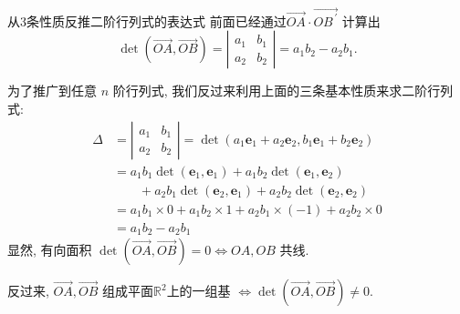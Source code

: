 \documentclass[10pt,punct]{ctexbeamer}
\begin{document}
\begin{frame}{从3条性质反推二阶行列式的表达式}
    前面已经通过$\overrightarrow{O A} \cdot \overrightarrow{O B^{\, \prime}}$ 计算出
    $$\operatorname{det}(\overrightarrow{O A}, \overrightarrow{O B})=\left|\begin{array}{ll}a_1 & b_1 \\ a_2 & b_2\end{array}\right|=a_1 b_2-a_2 b_1.$$


    为了推广到任意 $n$ 阶行列式, 我们反过来利用上面的三条基本性质来求二阶行列式:
    $$\begin{aligned} \Delta &=\left|\begin{array}{cc}a_1 & b_1 \\ a_2 & b_2\end{array}\right|=\operatorname{det}\left(a_1 \boldsymbol{e}_1+a_2 \boldsymbol{e}_2, b_1 \boldsymbol{e}_1+b_2 \boldsymbol{e}_2\right) \\
  & = a_1 b_1 \operatorname{det}\left(\boldsymbol{e}_1, \boldsymbol{e}_1\right)
  +a_1 b_2 \operatorname{det}\left(\boldsymbol{e}_1, \boldsymbol{e}_2\right)\\
  & \qquad
  +a_2 b_1 \operatorname{det}\left(\boldsymbol{e}_2, \boldsymbol{e}_1\right)
  +a_2 b_2 \operatorname{det}\left(\boldsymbol{e}_2, \boldsymbol{e}_2\right) \\
  & = a_1 b_1 \times 0+a_1 b_2 \times 1+a_2 b_1 \times(-1)+a_2 b_2 \times 0 \\ &=a_1 b_2-a_2 b_1 \end{aligned}$$
    显然, 有向面积 $\operatorname{det}(\overrightarrow{O A}, \overrightarrow{O B})=0 \Leftrightarrow O A, O B$ 共线.


    反过来, $\overrightarrow{O A}, \overrightarrow{O B}$ 组成平面$\mathbb{R}^2$上的一组基 $\Leftrightarrow \operatorname{det}(\overrightarrow{O A}, \overrightarrow{O B}) \neq 0$.

\end{frame}
\end{document}

